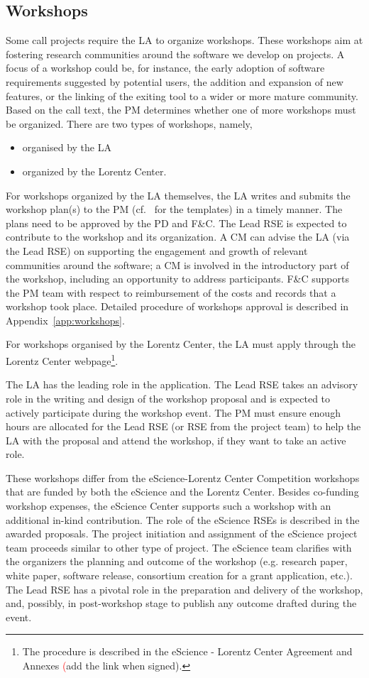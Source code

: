 \documentclass[11pt]{article}
\begin{document}
\subsection{Workshops}
\label{sec:exec:workshops}

Some call projects require the LA to organize workshops. These workshops aim at fostering research communities around
the software we develop on projects. A focus of a workshop could be, for instance, the early adoption of software
requirements suggested by potential users, the addition and expansion of new features, or the linking of the exiting
tool to a wider or more mature community. Based on the call text, the PM determines whether one of more workshops must
be organized. There are two types of workshops, namely,
\begin{itemize}
\item organised by the LA
\item organized by the Lorentz Center.
\end{itemize}

For workshops organized by the LA themselves, the LA writes and submits the workshop plan(s) to the PM (cf.~\cite{proj-templates} 
for the templates) in a timely manner. The plans need to be approved by the PD and F\&C. The
Lead RSE is expected to contribute to the workshop and its organization. A CM can advise the LA (via the Lead RSE) on
supporting the engagement and growth of relevant communities around the software; a CM is involved in the introductory
part of the workshop, including an opportunity to address participants. F\&C supports the PM team with respect to
reimbursement of the costs and records that a workshop took place. Detailed procedure of workshops approval is
described in Appendix~\ref{app:workshops}.

For workshops organised by the Lorentz Center, the LA must apply through the Lorentz Center webpage\footnote{The
procedure is described in the eScience - Lorentz Center Agreement and Annexes {\textcolor{red}(add the link when signed)}.}.

The LA has the leading role in the application. The Lead RSE takes an advisory role in the writing and design of the
workshop proposal and is expected to actively participate during the workshop event. The PM must ensure enough hours
are allocated for the Lead RSE (or RSE from the project team) to help the LA with the proposal and attend the workshop,
if they want to take an active role.

These workshops differ from the eScience-Lorentz Center Competition workshops that are funded by both the eScience and
the Lorentz Center. Besides co-funding workshop expenses, the eScience Center supports such a workshop with an
additional in-kind contribution. The role of the eScience RSEs is described in the awarded proposals. The project
initiation and assignment of the eScience project team proceeds similar to other type of project. The eScience team
clarifies with the organizers the planning and outcome of the workshop (e.g. research paper, white paper, software
release, consortium creation for a grant application, etc.). The Lead RSE has a pivotal role in the preparation and
delivery of the workshop, and, possibly, in post-workshop stage to publish any outcome drafted during the event. 
\end{document}
